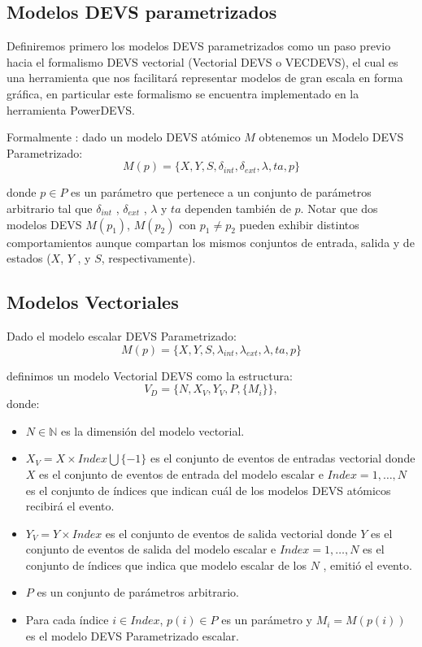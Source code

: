 	\subsection{Modelos DEVS parametrizados}
	Definiremos primero los modelos DEVS parametrizados\cite{BKC12} como un paso previo hacia el formalismo DEVS vectorial (Vectorial DEVS o VECDEVS), 
	el cual es una herramienta que nos facilitará representar modelos de gran escala en forma gráfica, en particular este formalismo se encuentra implementado 
	en la herramienta PowerDEVS.

	Formalmente : dado un modelo DEVS atómico $M$ obtenemos un Modelo DEVS Parametrizado:
	\begin{equation}
	M (p) = \{X, Y, S, \delta_{int}, \delta_{ext} ,\lambda , ta, p\}
	\end{equation}

	donde $p \in P$ es un parámetro que pertenece a un conjunto de parámetros arbitrario tal que $\delta_{int}$ , $\delta_{ext}$ , $\lambda$ y $ta$ 
	dependen también de $p$.
	Notar que dos modelos DEVS $M (p_1 )$, $M (p_2 )$ con $p_1 \neq p_2$ pueden exhibir distintos comportamientos aunque compartan los mismos conjuntos 
	de entrada, salida y de estados ($X$, $Y$ , y $S$, respectivamente).

	\subsection{Modelos Vectoriales}
	Dado el modelo escalar DEVS Parametrizado:
	\begin{equation}
		M (p) = \{X, Y, S, \lambda_{int} , \lambda_{ext} , \lambda, ta, p\}
		\end{equation}

		definimos un modelo Vectorial DEVS\cite{BKC12} como la estructura:
		\begin{equation}
		V_D = \{N, X_V, Y_V, P, \{M_i\}\},
		\end{equation}
		donde:
		\begin{itemize}
		\item $N \in \mathbb{N}$ es la dimensión del modelo vectorial.

		\item $X_V = X \times Index \bigcup \{-1\}$ es el conjunto de eventos de entradas vectorial donde $X$ es el conjunto de eventos de entrada del modelo 
		escalar e $Index = {1, \ldots , N }$ es el conjunto de índices que indican cuál de los modelos DEVS atómicos recibirá el evento.

		\item $Y_V = Y \times Index$ es el conjunto de eventos de salida vectorial donde $Y$ es el conjunto de eventos de salida del modelo escalar e 
		$Index = {1, \ldots , N }$ es el conjunto de índices que indica que modelo escalar de los $N$ , emitió el evento. 

		\item $P$ es un conjunto de parámetros arbitrario.

		\item Para cada índice $i \in Index$, $p(i) \in P$ es un parámetro y $M_i = M (p(i))$ es el modelo DEVS Parametrizado escalar.
	\end{itemize}

